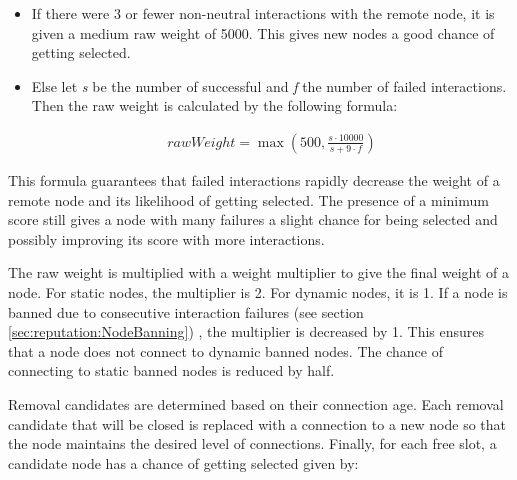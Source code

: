 \begin{itemize}
\item If there were 3 or fewer non-neutral interactions with the remote node, it is given a medium raw weight of 5000.
This gives new nodes a good chance of getting selected.
\item Else let {\it s} be the number of successful and {\it f} the number of failed interactions.
Then the raw weight is calculated by the following formula:

\begin{figure}[t!]
\end{figure}

\begin{align*}
rawWeight = \max\left(500, \frac{s \cdot 10000}{s + 9 \cdot f}\right)
\end{align*}
\end{itemize}

This formula guarantees that failed interactions rapidly decrease the weight of a remote node and its likelihood of getting selected.
The presence of a minimum score still gives a node with many failures a slight chance for being selected and possibly improving its score with more interactions.

The raw weight is multiplied with a weight multiplier to give the final weight of a node.
For static nodes, the multiplier is 2.
For dynamic nodes, it is 1.
If a node is banned due to consecutive interaction failures (see section \autoref{sec:reputation:NodeBanning}) , the multiplier is decreased by 1.
This ensures that a node does not connect to dynamic banned nodes.
The chance of connecting to static banned nodes is reduced by half.

Removal candidates are determined based on their connection age.
Each removal candidate that will be closed is replaced with a connection to a new node so that the node maintains the desired level of connections.
Finally, for each free slot, a candidate node has a chance of getting selected given by:


